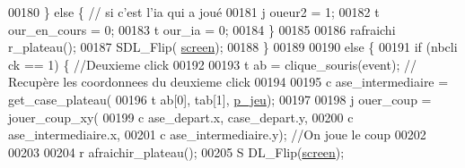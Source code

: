 \begin{DoxyCode}
00180                                                                         \} \textcolor{keywordflow}{else} \{ 
      \textcolor{comment}{// si c'est l'ia qui a joué}
00181                                                                                 j
      oueur2 = 1;
00182                                                                                 t
      our\_en\_cours = 0;
00183                                                                                 t
      our\_ia = 0;
00184                                                                         \}
00185 
00186                                                                         rafraichi
      r\_plateau();
00187                                                                         SDL\_Flip(
      \hyperlink{fonction_interface_8h_a78fa3957d73de49cb81d047857504218}{screen});
00188                                                                 \}
00189 
00190                                                                 \textcolor{keywordflow}{else} \{
00191                                                                         \textcolor{keywordflow}{if} (nbcli
      ck == 1) \{ \textcolor{comment}{//Deuxieme click}
00192 
00193                                                                                 t
      ab = clique\_souris(event); \textcolor{comment}{// Recupère les coordonnees du deuxieme click}
00194 
00195                                                                                 c
      ase\_intermediaire = get\_case\_plateau(
00196                                                                                                 t
      ab[0], tab[1], \hyperlink{moteur_8h_a3efa8d0f7c65daedc584dc8db048e62c}{p_jeu});
00197 
00198                                                                                 j
      ouer\_coup = jouer\_coup\_xy(
00199                                                                                                 c
      ase\_depart.x, case\_depart.y,
00200                                                                                                 c
      ase\_intermediaire.x,
00201                                                                                                 c
      ase\_intermediaire.y); \textcolor{comment}{//On joue le coup}
00202 
00203 
00204                                                                                 r
      afraichir\_plateau();
00205                                                                                 S
      DL\_Flip(\hyperlink{fonction_interface_8h_a78fa3957d73de49cb81d047857504218}{screen});

\end{DoxyCode}
